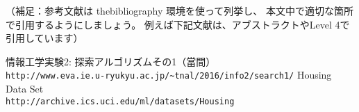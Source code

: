 \documentclass[uplatex,10pt]{jsarticle}
\begin{document}
\vspace{+1.0cm}
（補足：参考文献は thebibliography 環境を使って列挙し、
本文中で適切な箇所で引用するようにしましょう。
例えば下記文献は、アブストラクトやLevel 4で引用しています）
\begin{thebibliography}{99}
情報工学実験2: 探索アルゴリズムその1（當間）\\
\verb|http://www.eva.ie.u-ryukyu.ac.jp/~tnal/2016/info2/search1/|
Housing Data Set\\
\verb|http://archive.ics.uci.edu/ml/datasets/Housing|
\end{thebibliography}
\end{document}

